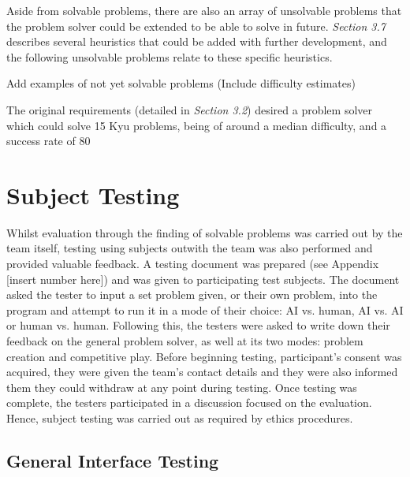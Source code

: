 \documentclass{l3proj}
\begin{document}
Aside from solvable problems, there are also an array of unsolvable problems that the problem solver could be extended to be able to solve in future. \textit{Section 3.7} describes several heuristics that could be added with further development, and the following unsolvable problems relate to these specific heuristics.

Add examples of not yet solvable problems (Include difficulty estimates)

The original requirements (detailed in \textit{Section 3.2}) desired a problem solver which could solve 15 Kyu problems, being of around a median difficulty, and a success rate of 80%

\section{Subject Testing}

Whilst evaluation through the finding of solvable problems was carried out by the team itself, testing using subjects outwith the team was also performed and provided valuable feedback. A testing document was prepared (see Appendix [insert number here]) and was given to participating test subjects. The document asked the tester to input a set problem given, or their own problem, into the program and attempt to run it in a mode of their choice: AI vs. human, AI vs. AI or human vs. human. Following this, the testers were asked to write down their feedback on the general problem solver, as well at its two modes: problem creation and competitive play. Before beginning testing, participant's consent was acquired, they were given the team's contact details and they were also informed them they could withdraw at any point during testing. Once testing was complete, the testers participated in a discussion focused on the evaluation. Hence, subject testing was carried out as required by ethics procedures.

\subsection{General Interface Testing}
\end{document}

